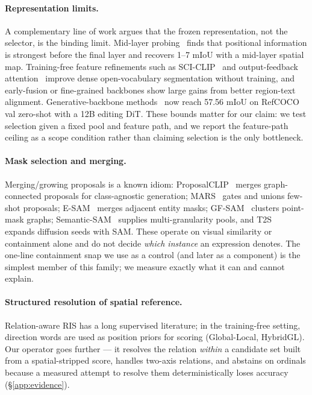 \paragraph{Representation limits.}
A complementary line of work argues that the frozen representation, not the
selector, is the binding limit. Mid-layer probing~\cite{blindposition2025}
finds that positional information is strongest before the final layer and
recovers 1--7 mIoU with a mid-layer spatial map. Training-free feature
refinements such as SCI-CLIP~\cite{sciclip2026} and output-feedback
attention~\cite{pluginfb2025} improve dense open-vocabulary segmentation
without training, and early-fusion or fine-grained backbones
\cite{evfsam2024,fgclip2025} show large gains from better region-text
alignment. Generative-backbone methods~\cite{earlygrounding2026} now reach
57.56 mIoU on RefCOCO val zero-shot with a 12B editing DiT. These bounds
matter for our claim: we test selection given a fixed pool and feature path,
and we report the feature-path ceiling as a scope condition rather than
claiming selection is the only bottleneck.

\paragraph{Mask selection and merging.}
Merging/growing proposals is a known idiom: ProposalCLIP~\cite{proposalclip2022}
merges graph-connected proposals for class-agnostic generation;
MARS~\cite{mars2026} gates and unions few-shot proposals;
E-SAM~\cite{esam2025} merges adjacent entity masks;
GF-SAM~\cite{gfsam2024} clusters point-mask graphs; Semantic-SAM~\cite{semanticsam2023} supplies multi-granularity pools, and
T2S~\cite{t2s2026} expands diffusion seeds with SAM. These operate on visual
similarity or containment alone and do not decide \emph{which instance} an
expression denotes. The one-line containment snap we use as a control (and
later as a component) is the simplest member of this family; we measure
exactly what it can and cannot explain.

\paragraph{Structured resolution of spatial reference.}
Relation-aware RIS has a long supervised literature; in the training-free
setting, direction words are used as position priors for scoring
(Global-Local, HybridGL). Our operator goes further --- it resolves the
relation \emph{within} a candidate set built from a spatial-stripped score,
handles two-axis relations, and abstains on ordinals because a measured
attempt to resolve them deterministically loses accuracy
(\S\ref{app:evidence}).


